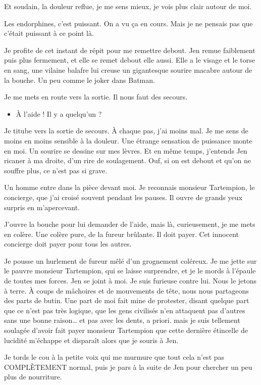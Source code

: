 Et soudain, la douleur reflue, je me sens mieux, je vois plus clair autour de moi.

Les endorphines, c'est puissant. On a vu ça en cours. Mais je ne pensais pas que c'était puissant à ce point là.

Je profite de cet instant de répit pour me remettre debout. Jen remue faiblement puis plus fermement, et elle se remet debout elle aussi. Elle a le visage et le torse en sang, une vilaine balafre lui creuse un gigantesque sourire macabre autour de la bouche. Un peu comme le joker dans Batman.

Je me mets en route vers la sortie. Il nous faut des secours.

\begin{itemize}
\item À l'aide ! Il y a quelqu'un ?
\end{itemize}

Je titube vers la sortie de secours. À chaque pas, j'ai moins mal. Je me sens de moins en moins sensible à la douleur. Une étrange sensation de puissance monte en moi. Un sourire se dessine sur mes lèvres. Et en même temps, j'entends Jen ricaner à ma droite, d'un rire de soulagement. Ouf, si on est debout et qu'on ne souffre plus, ce n'est pas si grave.

Un homme entre dans la pièce devant moi. Je reconnais monsieur Tartempion, le concierge, que j'ai croisé souvent pendant les pauses. Il ouvre de grands yeux surpris en m'apercevant.

J'ouvre la bouche pour lui demander de l'aide, mais là, curieusement, je me mets en colère. Une colère pure, de la fureur brûlante. Il doit payer. Cet innocent concierge doit payer pour tous les autres.

Je pousse un hurlement de fureur mêlé d'un grognement coléreux. Je me jette sur le pauvre monsieur Tartempion, qui se laisse surprendre, et je le mords à l'épaule de toutes mes forces. Jen se joint à moi. Je suis furieuse contre lui. Nous le jetons à terre. À coups de mâchoires et de mouvements de tête, nous nous partageons des parts de butin. Une part de moi fait mine de protester, disant quelque part que ce n'est pas très logique, que les gens civilisés n'en attaquent pas d'autres sans une bonne raison… et pas avec les dents, a priori. mais je suis tellement soulagée d'avoir fait payer monsieur Tartempion que cette dernière étincelle de lucidité m'échappe et disparaît alors que je souris à Jen.

Je tords le cou à la petite voix qui me murmure que tout cela n'est pas COMPLÈTEMENT normal, puis je pars à la suite de Jen pour chercher un peu plus de nourriture.

